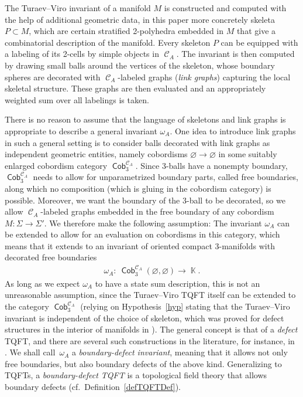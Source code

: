 \documentclass[pdftex]{sigma}
\DeclareMathOperator{\K}{\mathbb{K}}
\DeclareMathOperator{\Cob}{\mathsf{Cob}}
\DeclareMathOperator{\calc}{\mathcal{C}}
\numberwithin{equation}{section}
\theoremstyle{definition}
\begin{document}
The Turaev--Viro invariant of a manifold $M$ is constructed and computed with the help of additional geometric data, in this paper more concretely skeleta $P \subset M$, which are certain stratified 2-polyhedra embedded in $M$ that give a combinatorial description of the manifold. Every skeleton $P$ can be equipped with a labeling of its 2-cells by simple objects in $\calc_A$. The invariant is then computed by drawing small balls around the vertices of the skeleton, whose boundary spheres are decorated with $\calc_A$-labeled graphs (\textit{link graphs}) capturing the local skeletal structure. These graphs are then evaluated and an appropriately weighted sum over all labelings is taken.

There is no reason to assume that the language of skeletons and link graphs is appropriate to describe a general invariant $\omega_A$.
One idea to introduce link graphs in such a general setting is to consider balls decorated with link graphs as independent geometric entities, namely cobordisms $\varnothing \rightarrow \varnothing$ in some suitably enlarged cobordism category $\Cob_3^{\calc_A}$. Since 3-balls have a nonempty boundary, $\Cob_3^{\calc_A}$ needs to allow for unparametrized boundary parts, called free boundaries, along which no composition (which is gluing in the cobordism category) is possible. Moreover, we want the boundary of the 3-ball to be decorated, so we allow $\calc_A$-labeled graphs embedded in the free boundary of any cobordism $M\colon \Sigma \rightarrow \Sigma'$.
We therefore make the following assumption: The invariant $\omega_A$ can be extended to allow for an evaluation on cobordisms in this category, which means that it extends to an invariant of oriented compact 3-manifolds with decorated free boundaries
\begin{align*}
 \omega_A\colon \ \Cob_3^{\calc_A}(\varnothing, \varnothing) \rightarrow \K.
\end{align*}
As long as we expect $\omega_A$ to have a state sum description, this is not an unreasonable assumption, since the Turaev--Viro TQFT itself can be extended to the category $\Cob_3^{\calc_A}$ (relying on Hypothesis~\ref{hyp} stating that the Turaev--Viro invariant is independent of the choice of skeleton, which was proved for defect structures in the interior of manifolds in \cite[Chapter~15]{TV}). The general concept is that of a \textit{defect} TQFT, and there are several such constructions in the literature, for instance, in \cite{M, TV}. We shall call~$\omega_A$ a \textit{boundary-defect invariant}, meaning that it allows not only free boundaries, but also boundary defects of the above kind. Generalizing to TQFTs, a \textit{boundary-defect TQFT} is a topological field theory that allows boundary defects (cf.~Definition~\ref{defTQFTDef}).
\end{document}
